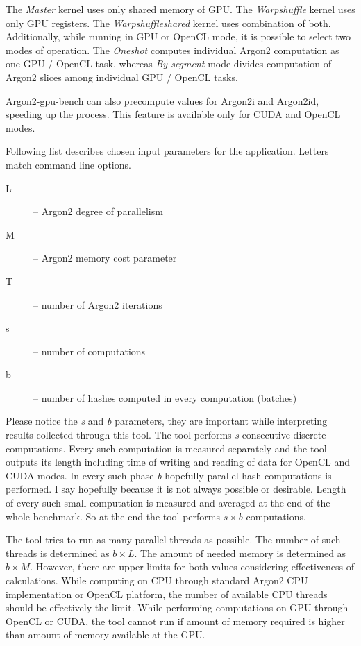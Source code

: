 \documentclass[nolof,digital]{fithesis3}
\begin{document}
The \emph{Master} kernel uses only shared memory of GPU. The \emph{Warpshuffle} kernel uses only GPU registers. The \emph{Warpshuffleshared} kernel uses combination of both. Additionally, while running in GPU or OpenCL mode, it is possible to select two modes of operation. The \emph{Oneshot} computes individual Argon2 computation as one GPU / OpenCL task, whereas \emph{By-segment} mode divides computation of Argon2 slices among individual GPU / OpenCL tasks.

Argon2-gpu-bench can also precompute values for Argon2i and Argon2id, speeding up the process. This feature is available only for CUDA and OpenCL modes.

Following list describes chosen input parameters for the application. Letters match command line options.

\begin{description}
\item[L] -- Argon2 degree of parallelism

\item[M] -- Argon2 memory cost parameter

\item[T] -- number of Argon2 iterations

\item[s] -- number of computations

\item[b] -- number of hashes computed in every computation (batches)
\end{description}

Please notice the \emph{s} and \emph{b} parameters, they are important while interpreting results collected through this tool. The tool performs \emph{s} consecutive discrete computations. Every such computation is measured separately and the tool outputs its length including time of writing and reading of data for OpenCL and CUDA modes. In every such phase \emph{b} hopefully parallel hash computations is performed. I say hopefully because it is not always possible or desirable. Length of every such small computation is measured and averaged at the end of the whole benchmark.  So at the end the tool performs $s \times b$ computations.

The tool tries to run as many parallel threads as possible. The number of such threads is determined as $b \times L$. The amount of needed memory is determined as $b \times M$. However, there are upper limits for both values considering effectiveness of calculations. While computing on CPU through standard Argon2 CPU implementation or OpenCL platform, the number of available CPU threads should be effectively the limit. While performing computations on GPU through OpenCL or CUDA, the tool cannot run if amount of memory required is higher than amount of memory available at the GPU.
\end{document}
